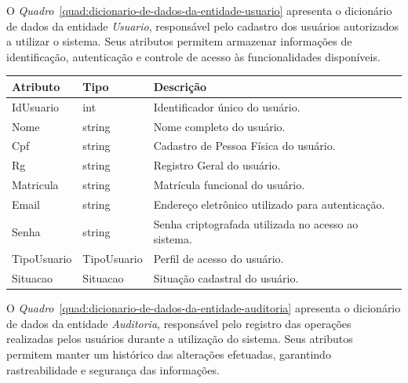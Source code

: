 O \textit{Quadro}~\ref{quad:dicionario-de-dados-da-entidade-usuario} apresenta o dicionário de dados da entidade \textit{Usuario}, responsável pelo cadastro dos usuários autorizados a utilizar o sistema. Seus atributos permitem armazenar informações de identificação, autenticação e controle de acesso às funcionalidades disponíveis.

\begin{quadro}[H]
\caption[Dicionário de dados da entidade Usuario]{Dicionário de dados da entidade Usuario}
\label{quad:dicionario-de-dados-da-entidade-usuario}

\begin{tabular}{|p{}|p{}|p{}|}
\hline
\textbf{Atributo} & \textbf{Tipo} & \textbf{Descrição} \\ 
\hline
IdUsuario & int & Identificador único do usuário. \\ 
\hline
Nome & string & Nome completo do usuário. \\ 
\hline
Cpf & string & Cadastro de Pessoa Física do usuário. \\ 
\hline
Rg & string & Registro Geral do usuário. \\ 
\hline
Matricula & string & Matrícula funcional do usuário. \\ 
\hline
Email & string & Endereço eletrônico utilizado para autenticação. \\ 
\hline
Senha & string & Senha criptografada utilizada no acesso ao sistema. \\ 
\hline
TipoUsuario & TipoUsuario & Perfil de acesso do usuário. \\ 
\hline
Situacao & Situacao & Situação cadastral do usuário. \\ 
\hline
\end{tabular}


\end{quadro}



O \textit{Quadro}~\ref{quad:dicionario-de-dados-da-entidade-auditoria} apresenta o dicionário de dados da entidade \textit{Auditoria}, responsável pelo registro das operações realizadas pelos usuários durante a utilização do sistema. Seus atributos permitem manter um histórico das alterações efetuadas, garantindo rastreabilidade e segurança das informações.

